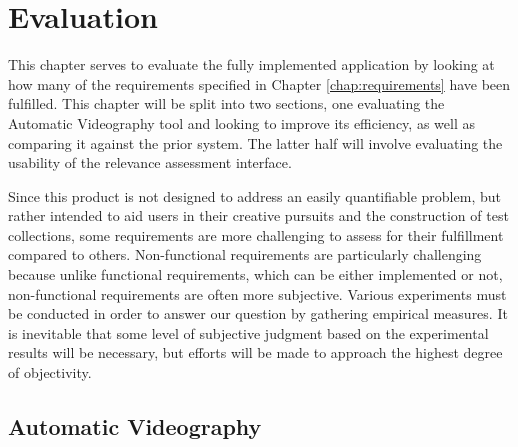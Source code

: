 \documentclass{l4proj}
\begin{document}





\chapter{Evaluation} 
This chapter serves to evaluate the fully implemented application by looking at how many of the requirements specified in Chapter \ref{chap:requirements} have been fulfilled. This chapter will be split into two sections, one evaluating the Automatic Videography tool and looking to improve its efficiency, as well as comparing it against the prior system. The latter half will involve evaluating the usability of the relevance assessment interface. 

Since this product is not designed to address an easily quantifiable problem, but rather intended to aid users in their creative pursuits and the construction of test collections, some requirements are more challenging to assess for their fulfillment compared to others. Non-functional requirements are particularly challenging because unlike functional requirements, which can be either implemented or not, non-functional requirements are often more subjective. Various experiments must be conducted in order to answer our question by gathering empirical measures. It is inevitable that some level of subjective judgment based on the experimental results will be necessary, but efforts will be made to approach the highest degree of objectivity.

\section{Automatic Videography}
\end{document}
